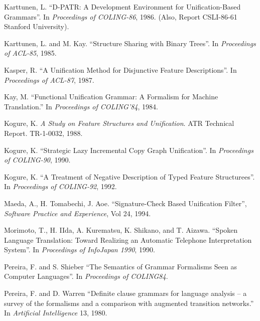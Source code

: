\begin{thebibliography}{References}
Karttunen, L. 
``D-PATR: A Development Environment for Unification-Based
Grammars''.
In {\it Proceedings of COLING-86}, 1986. (Also, Report
CSLI-86-61 Stanford University).

Karttunen, L. and M. Kay. 
``Structure Sharing with Binary Trees''.
In {\it Proceedings of ACL-85}, 1985.

 Kasper, R.
``A Unification Method for Disjunctive Feature Descriptions''.
In {\it Proceedings of ACL-87}, 1987.


Kay, M.
``Functional Unification Grammar: A Formalism for Machine
Translation.''
In {\it Proceedings of COLING'84}, 1984.




 Kogure, K.
{\it A Study on Feature Structures and Unification}.
   ATR Technical Report. TR-1-0032, 1988.

 Kogure, K.
``Strategic Lazy Incremental Copy Graph Unification''.
In {\it Proceedings of COLING-90}, 1990.

 Kogure, K.
``A Treatment of Negative Description of Typed Feature Structurees''.
In {\it Proceedings of COLING-92}, 1992.


Maeda, A., H. Tomabechi, J. Aoe.
``Signature-Check Based Unification Filter'',
{\it Software Practice and Experience}, Vol 24, 1994.


Morimoto, T., H. IIda, A. Kurematsu, K. Shikano, and T. Aizawa.
``Spoken Language Translation: Toward Realizing an Automatic
Telephone Interpretation System''.
 In {\it Proceedings of InfoJapan 1990}, 1990.



Pereira, F. and S. Shieber
``The Semantics of Grammar Formalisms Seen as Computer Languages''.
In {\it Proceedings of COLING84}.

Pereira, F. and D. Warren
``Definite clause grammars for language analysis -- a survey of the
formalisms and a comparison with augmented transition networks.''
In {\it Artificial Intelligence} 13, 1980.


\end{thebibliography}
